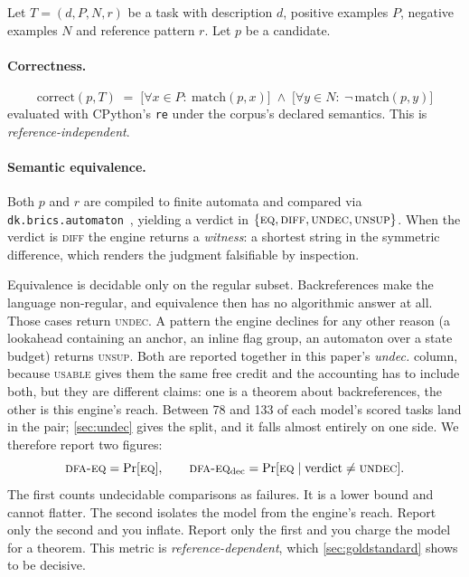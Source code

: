 \documentclass[11pt]{article}
\newcommand{\usable}{\textsc{usable}}
\newcommand{\dfaeq}{\textsc{dfa-eq}}
\begin{document}
Let $T=(d, P, N, r)$ be a task with description $d$, positive examples $P$,
negative examples $N$ and reference pattern $r$. Let $p$ be a candidate.

\paragraph{Correctness.}
\[
\mathrm{correct}(p,T) \;=\; \big[\forall x \in P:\ \mathrm{match}(p,x)\big]
\;\wedge\;
\big[\forall y \in N:\ \neg\,\mathrm{match}(p,y)\big]
\]
evaluated with CPython's \texttt{re} under the corpus's declared semantics.
This is \emph{reference-independent}.

\paragraph{Semantic equivalence.}
Both $p$ and $r$ are compiled to finite automata and compared via
\texttt{dk.brics.automaton}~\citep{brics}, yielding a
verdict in $\{\textsc{eq}, \textsc{diff}, \textsc{undec}, \textsc{unsup}\}$.
When the verdict is \textsc{diff} the engine returns a \emph{witness}: a
shortest string in the symmetric difference, which renders the judgment
falsifiable by inspection.

Equivalence is decidable only on the regular subset. Backreferences make the
language non-regular, and equivalence then has no algorithmic answer at all.
Those cases return \textsc{undec}. A pattern the engine declines for any other
reason (a lookahead containing an anchor, an inline flag group, an automaton
over a state budget) returns \textsc{unsup}. Both are reported together in
this paper's \emph{undec.} column, because \usable{} gives them the same free
credit and the accounting has to include both, but they are different claims:
one is a theorem about backreferences, the other is this engine's reach.
Between 78 and 133 of each model's scored tasks land in the pair;
\cref{sec:undec} gives the split, and it falls almost entirely on one side.
We therefore report two figures:
\[
\dfaeq{} = \Pr[\textsc{eq}], \qquad
\dfaeq{}_{\text{dec}} = \Pr[\textsc{eq} \mid \text{verdict} \neq \textsc{undec}].
\]
The first counts undecidable comparisons as failures. It is a lower bound
and cannot flatter. The second isolates the model from the engine's reach.
Report only the second and you inflate. Report only the first and you charge
the model for a theorem. This metric is \emph{reference-dependent}, which
\cref{sec:goldstandard} shows to be decisive.
\end{document}
